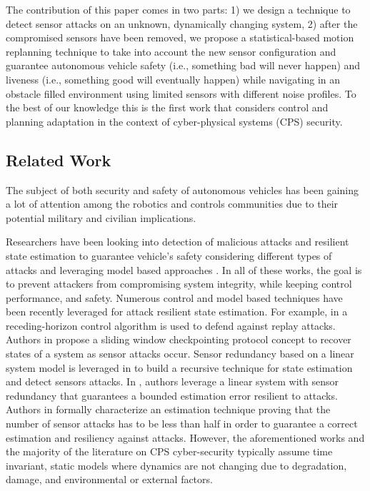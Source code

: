 The contribution of this paper comes in two parts: 1) we design a technique to detect sensor attacks on an unknown, dynamically changing system, 2) after the compromised sensors have been removed, we propose a statistical-based motion replanning technique to take into account the new sensor configuration and  guarantee autonomous vehicle safety (i.e., something bad will never happen) and liveness (i.e., something good will eventually happen) while navigating in an obstacle filled environment using limited sensors with different noise profiles. 
To the best of our knowledge this is the first work that considers control and planning adaptation in the context of cyber-physical systems (CPS) security.

\subsection{Related Work}
\label{sec:Related Work}

The subject of both security and safety of autonomous vehicles has been gaining a lot of attention among the robotics  and controls communities due to their potential military and civilian implications.

Researchers have been looking into detection of malicious attacks and resilient state estimation to guarantee vehicle's safety considering different types of attacks and leveraging model based approaches \cite{zhu2012resilient, fawzi2014secure, 6943080, 7330811}. In all of these works, the goal is to prevent attackers from compromising system integrity, while keeping control performance, and safety. Numerous control and model based techniques have been recently leveraged for attack resilient state estimation. For example, in \cite{zhu2012resilient} a receding-horizon control algorithm is used to defend against replay attacks. Authors in \cite{8443718} propose a sliding window checkpointing protocol concept to recover states of a system as sensor attacks occur. Sensor redundancy based on a linear system model is leveraged in \cite{6943080} to build a recursive technique for state estimation and detect sensors attacks. In \cite{7330811}, authors leverage a linear system with sensor redundancy that guarantees a bounded estimation error resilient to attacks. Authors in \cite{fawzi2014secure} formally characterize an estimation technique proving that the number of sensor attacks has to be less than half in order to guarantee a correct estimation and resiliency against attacks. However, the aforementioned works and the majority of the literature on CPS cyber-security typically assume time invariant, static models where dynamics are not changing due to degradation, damage, and environmental or external factors. 

